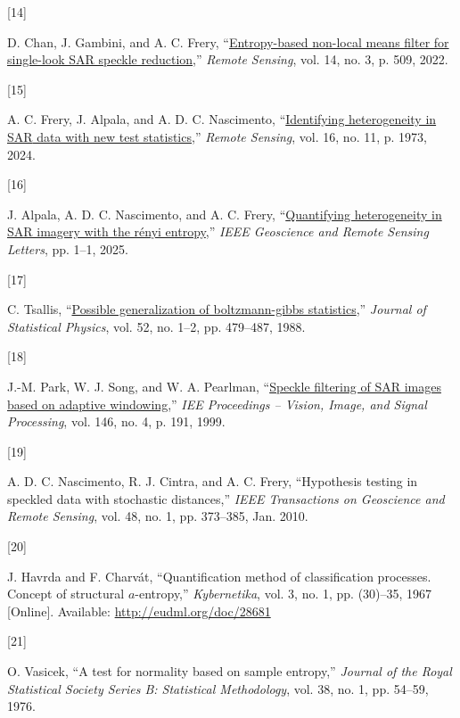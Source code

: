 \documentclass[
  lettersize  journal,
]{IEEEtran}%
\newlength{\cslhangindent}
\newlength{\csllabelwidth}
\newenvironment{CSLReferences}[2] %
 {\begin{list}{}{%
  \setlength{\itemindent}{0pt}
  \setlength{\leftmargin}{0pt}
  \setlength{\parsep}{0pt}
  \ifodd #1
   \setlength{\leftmargin}{\cslhangindent}
   \setlength{\itemindent}{-1\cslhangindent}
  \fi
  \setlength{\itemsep}{#2\baselineskip}}}
 {\end{list}}
\newcommand{\CSLLeftMargin}[1]{\parbox[t]{\csllabelwidth}{\strut#1\strut}}
\newcommand{\CSLRightInline}[1]{\parbox[t]{\linewidth - \csllabelwidth}{\strut#1\strut}}
\begin{document}
\begin{CSLReferences}{0}{0}
\CSLLeftMargin{{[}14{]} }%
\CSLRightInline{D. Chan, J. Gambini, and A. C. Frery,
{``\href{https://doi.org/10.3390/rs14030509}{Entropy-based non-local
means filter for single-look SAR speckle reduction},''} \emph{Remote
Sensing}, vol. 14, no. 3, p. 509, 2022. }

\CSLLeftMargin{{[}15{]} }%
\CSLRightInline{A. C. Frery, J. Alpala, and A. D. C. Nascimento,
{``\href{https://doi.org/10.3390/rs16111973}{Identifying heterogeneity
in {SAR} data with new test statistics},''} \emph{Remote Sensing}, vol.
16, no. 11, p. 1973, 2024. }

\CSLLeftMargin{{[}16{]} }%
\CSLRightInline{J. Alpala, A. D. C. Nascimento, and A. C. Frery,
{``\href{https://doi.org/10.1109/lgrs.2025.3581855}{Quantifying
heterogeneity in SAR imagery with the rényi entropy},''} \emph{IEEE
Geoscience and Remote Sensing Letters}, pp. 1--1, 2025. }

\CSLLeftMargin{{[}17{]} }%
\CSLRightInline{C. Tsallis,
{``\href{https://doi.org/10.1007/bf01016429}{Possible generalization of
boltzmann-gibbs statistics},''} \emph{Journal of Statistical Physics},
vol. 52, no. 1--2, pp. 479--487, 1988. }

\CSLLeftMargin{{[}18{]} }%
\CSLRightInline{J.-M. Park, W. J. Song, and W. A. Pearlman,
{``\href{https://doi.org/10.1049/ip-vis:19990550}{Speckle filtering of
SAR images based on adaptive windowing},''} \emph{IEE Proceedings --
Vision, Image, and Signal Processing}, vol. 146, no. 4, p. 191, 1999. }

\CSLLeftMargin{{[}19{]} }%
\CSLRightInline{A. D. C. Nascimento, R. J. Cintra, and A. C. Frery,
{``Hypothesis testing in speckled data with stochastic distances,''}
\emph{{IEEE} Transactions on Geoscience and Remote Sensing}, vol. 48,
no. 1, pp. 373--385, Jan. 2010. }

\CSLLeftMargin{{[}20{]} }%
\CSLRightInline{J. Havrda and F. Charvát, {``Quantification method of
classification processes. Concept of structural \(a\)-entropy,''}
\emph{Kybernetika}, vol. 3, no. 1, pp. (30)--35, 1967 {[}Online{]}.
Available: \url{http://eudml.org/doc/28681}}

\CSLLeftMargin{{[}21{]} }%
\CSLRightInline{O. Vasicek, {``A test for normality based on sample
entropy,''} \emph{Journal of the Royal Statistical Society Series B:
Statistical Methodology}, vol. 38, no. 1, pp. 54--59, 1976. }


\end{CSLReferences}
\end{document}
